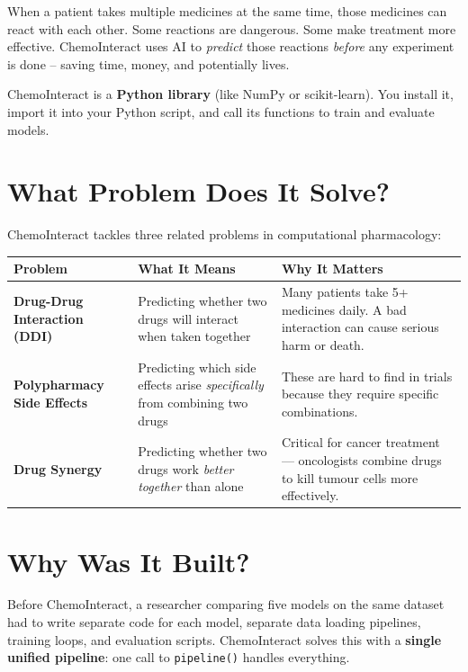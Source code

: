 \documentclass[12pt,a4paper,oneside]{book}
\begin{document}
When a patient takes multiple medicines at the same time, those medicines can react with each other. Some reactions are dangerous. Some make treatment more effective. ChemoInteract uses AI to \textit{predict} those reactions \textit{before} any experiment is done -- saving time, money, and potentially lives.

\begin{tcolorbox}[notebox]
ChemoInteract is a \textbf{Python library} (like NumPy or scikit-learn). You install it, import it into your Python script, and call its functions to train and evaluate models.
\end{tcolorbox}

\section{What Problem Does It Solve?}

ChemoInteract tackles three related problems in computational pharmacology:

\begin{longtable}{>{\bfseries}p{4.5cm}p{5cm}p{5cm}}
\toprule
\textbf{Problem} & \textbf{What It Means} & \textbf{Why It Matters} \\
\midrule\endhead
Drug-Drug Interaction (DDI) &
Predicting whether two drugs will interact when taken together &
Many patients take 5+ medicines daily. A bad interaction can cause serious harm or death. \\
\midrule
Polypharmacy Side Effects &
Predicting which side effects arise \textit{specifically} from combining two drugs &
These are hard to find in trials because they require specific combinations. \\
\midrule
Drug Synergy &
Predicting whether two drugs work \textit{better together} than alone &
Critical for cancer treatment --- oncologists combine drugs to kill tumour cells more effectively. \\
\bottomrule
\end{longtable}

\section{Why Was It Built?}

Before ChemoInteract, a researcher comparing five models on the same dataset had to write separate code for each model, separate data loading pipelines, training loops, and evaluation scripts. ChemoInteract solves this with a \textbf{single unified pipeline}: one call to \texttt{pipeline()} handles everything.
\end{document}
